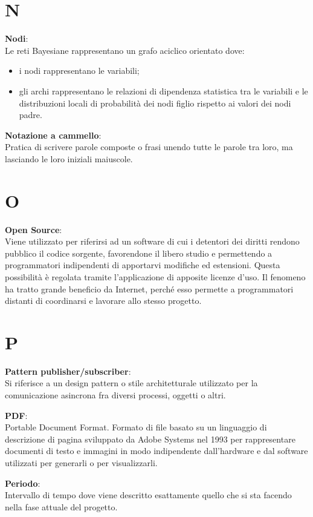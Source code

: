 \documentclass[a4paper, oneside, openany, dvipsnames, table]{article}
\begin{document}
\newpage
\section{N}
\textbf{Nodi}:\\	Le reti Bayesiane rappresentano un grafo aciclico orientato dove:
\begin{itemize}
\item i nodi rappresentano le variabili;
\item gli archi rappresentano le relazioni di dipendenza statistica tra le variabili e le distribuzioni locali di probabilità dei nodi figlio rispetto ai valori dei nodi padre.
\end{itemize}

\textbf{Notazione a cammello}:\\	Pratica di scrivere parole composte o frasi unendo tutte le parole tra loro, ma lasciando le loro iniziali maiuscole.

\newpage
\section{O}
\textbf{Open Source}:\\	Viene utilizzato per riferirsi ad un software di cui i detentori dei diritti rendono pubblico il codice sorgente, favorendone il libero studio e permettendo a programmatori indipendenti di apportarvi modifiche ed estensioni. Questa possibilità è regolata tramite l'applicazione di apposite licenze d'uso. Il fenomeno ha tratto grande beneficio da Internet, perché esso permette a programmatori distanti di coordinarsi e lavorare allo stesso progetto.

\newpage
\section{P}
\textbf{Pattern publisher/subscriber}:\\	 Si riferisce a un design pattern o stile architetturale utilizzato per la comunicazione asincrona fra diversi processi, oggetti o altri.

\textbf{PDF}:\\	Portable Document Format. Formato di file basato su un linguaggio di descrizione di pagina sviluppato da Adobe Systems nel 1993 per rappresentare documenti di testo e immagini in modo indipendente dall'hardware e dal software utilizzati per generarli o per visualizzarli.

\textbf{Periodo}:\\	Intervallo di tempo dove viene descritto esattamente quello che si sta facendo nella fase attuale del progetto.
\end{document}
